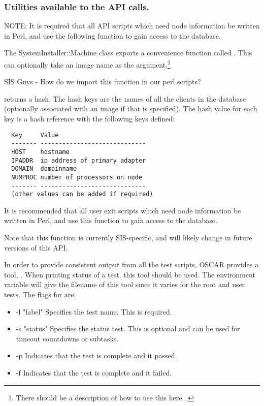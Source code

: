 \subsubsection{Utilities available to the API calls.}
\label{sec:api-utils}

NOTE: It is required that all API scripts which need node information be
written in Perl, and use the following function to gain access to the
database.

The SystemInstaller::Machine class exports a convenience function
called .  This can optionally take an image
name as the argument.\footnote{There should be a description of how to
  use this here...}

\begin{discuss}
SIS Guys - How do we import this function in our perl scripts?
\end{discuss}

 returns a hash.  The hash keys are the
names of all the clients in the database (optionally associated with
an image if that is specified).  The hash value for each key is a hash
reference with the following keys defined:

\begin{verbatim}
  Key     Value
  ------- -----------------------------
  HOST    hostname
  IPADDR  ip address of primary adapter
  DOMAIN  domainname
  NUMPROC number of processors on node
  ------- -----------------------------
  (other values can be added if required)
\end{verbatim}

It is recommended that all user exit scripts which need node
information be written in Perl, and use this function to gain access
to the database.

Note that this function is currently SIS-specific, and will likely
change in future versions of this API.


In order to provide consistent output from all the test scripts, OSCAR
provides a tool, . When printing status of a test, this tool
should be used. The environment variable  will
give the filename of this tool since it varies for the root and user 
tests. The flags for  are:
\begin{itemize}
\item -l "label"  Specifies the test name. This is required.
\item -s "status" Specifies the status test. This is optional and can be 
                  used for timeout countdowns or subtasks.
\item -p          Indicates that the test is complete and it passed.
\item -f          Indicates that the test is complete and it failed.
\end{itemize}



